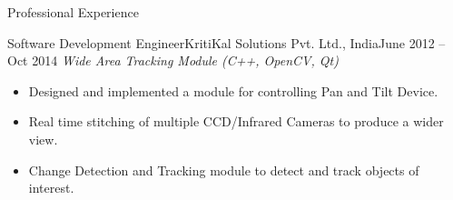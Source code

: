 \documentclass[]{mcdowellcv}
\begin{document}
\begin{cvsection}{Professional Experience}
\begin{cvsubsection}{Software Development Engineer}{KritiKal Solutions Pvt. Ltd., India}{June 2012 -- Oct 2014}
            \textit{Wide Area Tracking Module (C++, OpenCV, Qt)}
            \begin{itemize}
                \item Designed and implemented a module for controlling Pan and Tilt Device.
                \item Real time stitching of multiple CCD/Infrared Cameras to produce a wider view.
                \item Change Detection and Tracking module to detect and track objects of interest.
            \end{itemize}
        \end{cvsubsection}
    \end{cvsection}

    \newpage  %

\end{document}
